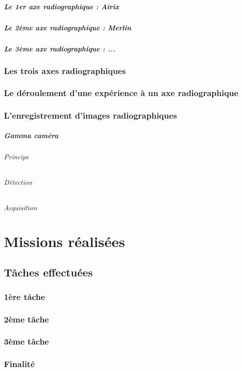 \documentclass[12pt,a4paper]{report}
\begin{document}
\paragraph{Le 1er axe radiographique : Airix}
\paragraph{Le 2ème axe radiographique : Merlin}
\paragraph{Le 3ème axe radiographique : ...}
\subsection{Les trois axes radiographiques}
\subsection{Le déroulement d'une expérience à un axe radiographique}
\subsection{L'enregistrement d'images radiographiques}
\paragraph{Gamma caméra}
\subparagraph{Principe}
\subparagraph{Détection}
\subparagraph{Acquisition}


\chapter{Missions réalisées}
\section{Tâches effectuées}
\subsection{1ère tâche}
\subsection{2ème tâche}
\subsection{3ème tâche}
\subsection{Finalité}
\end{document}
